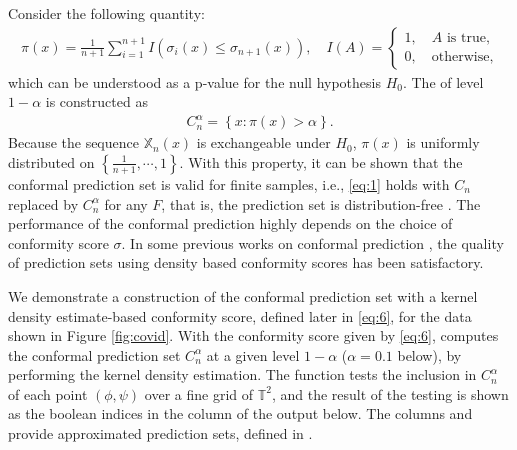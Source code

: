 Consider the following quantity:
\begin{align*}
    \pi\left(x\right) = \frac{1}{n+1}\sum_{i=1}^{n+1}I\left(\sigma_i\left(x\right)\le\sigma_{n+1}\left(x\right)\right),\quad I(A) = \begin{cases}
    1,\quad A\text{ is true,}\\ 0,\quad \text{otherwise,}
    \end{cases}
\end{align*}
which can be understood as a p-value for the null hypothesis $H_0$. The  of level $1-\alpha$ is constructed as
\begin{align}
    C^{\alpha}_n=\left\{x:\pi\left(x\right)>\alpha\right\}.
\end{align}
Because the sequence $\mathbb{X}_n(x)$ is exchangeable under $H_0$, $\pi\left(x\right)$ is uniformly distributed on $\left\{\frac{1}{n+1},\cdots,1\right\}$. With this property, it can be shown that the conformal prediction set is valid for finite samples, i.e., \eqref{eq:1} holds with $C_n$ replaced by $C_n^{\alpha}$ for any $F$, that is, the prediction set is distribution-free \citep{Lei:2013}. The performance of the conformal prediction highly depends on the choice of conformity score $\sigma$. In some previous works on conformal prediction \citep{Lei:2013, Lei:2015, Shin:2019, Jung:2021}, the quality of prediction sets using density based conformity scores has been satisfactory.

We demonstrate a construction of the conformal prediction set with a kernel density estimate-based conformity score, defined later in \eqref{eq:6}, for the data shown in Figure \ref{fig:covid}.
With the conformity score given by \eqref{eq:6},  computes the conformal prediction set $C_n^\alpha$ at a given level $1-\alpha$ ($\alpha=0.1$ below), by performing the kernel density estimation. The function tests the inclusion in $C_n^\alpha$ of each point $(\phi,\psi)$ over a fine grid of $\mathbb{T}^2$, and the result of the testing is shown as the boolean indices in the column  of the output below.
%
The columns  and  provide approximated prediction sets, defined in \citet{Jung:2021}.

